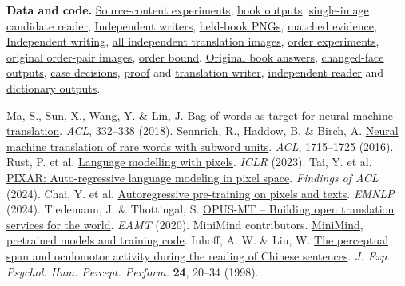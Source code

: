 \documentclass[10pt,a4paper]{article}
\newcommand{\repo}[2]{\href{https://github.com/lachlanchen/ImagizedLanguageModel/blob/main/#1}{\underline{#2}}}
\begin{document}
\small\noindent\textbf{Data and code.} \repo{references/source_supported_writing_result.md}{Source-content experiments}, \repo{publication/ilm-nature/evidence/source_supported_writing.zip}{book outputs}, \repo{scripts/select_visual_translation.py}{single-image candidate reader}, \repo{models/independent_optical_actions}{Independent writers}, \repo{publication/ilm-nature/evidence/independent_optical_actions.zip}{held-book PNGs}, \repo{references/independent_optical_actions_result.md}{matched evidence}, \repo{references/sentence_reconstruction_result.md}{Independent writing}, \repo{publication/ilm-nature/evidence/sentence_reconstruction_answers.zip}{all independent translation images}, \repo{references/visual_order_result.md}{order experiments}, \repo{publication/ilm-nature/evidence/visual_order_answers.zip}{original order-pair images}, \repo{formal/span_list/VisualFieldOrder.lean}{order bound}. \repo{publication/ilm-nature/evidence/pictured_path_answers.zip}{Original book answers}, \repo{publication/ilm-nature/evidence/pictured_path_serif.zip}{changed-face outputs}, \repo{references/evidence/pictured_path_translation_v1}{case decisions}, \repo{formal/span_list/SourcePathRepair.lean}{proof} and \repo{scripts/write_optical_span.py}{translation writer}, \repo{models/origin_value_reader}{independent reader} and \repo{publication/ilm-nature/evidence/grounded_origin_answers.zip}{dictionary outputs}.\par
{\footnotesize
\begin{thebibliography}{8}\setlength{\itemsep}{0pt}
 Ma, S., Sun, X., Wang, Y. \& Lin, J. \href{https://aclanthology.org/P18-2053/}{Bag-of-words as target for neural machine translation}. \textit{ACL}, 332--338 (2018).
 Sennrich, R., Haddow, B. \& Birch, A. \href{https://aclanthology.org/P16-1162/}{Neural machine translation of rare words with subword units}. \textit{ACL}, 1715--1725 (2016).
 Rust, P. et al. \href{https://arxiv.org/abs/2207.06991}{Language modelling with pixels}. \textit{ICLR} (2023).
 Tai, Y. et al. \href{https://aclanthology.org/2024.findings-acl.874/}{PIXAR: Auto-regressive language modeling in pixel space}. \textit{Findings of ACL} (2024).
 Chai, Y. et al. \href{https://aclanthology.org/2024.emnlp-main.182/}{Autoregressive pre-training on pixels and texts}. \textit{EMNLP} (2024).
 Tiedemann, J. \& Thottingal, S. \href{https://aclanthology.org/2020.eamt-1.61/}{OPUS-MT -- Building open translation services for the world}. \textit{EAMT} (2020).
 MiniMind contributors. \href{https://github.com/jingyaogong/minimind/tree/858008eb98da4428f78053a1cc4d3a3bd5973629}{MiniMind, pretrained models and training code}.
 Inhoff, A. W. \& Liu, W. \href{https://pubmed.ncbi.nlm.nih.gov/9483822/}{The perceptual span and oculomotor activity during the reading of Chinese sentences}. \textit{J. Exp. Psychol. Hum. Percept. Perform.} \textbf{24}, 20--34 (1998).
\end{thebibliography}}
\end{document}
